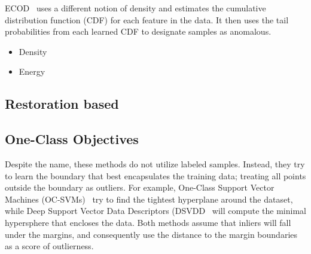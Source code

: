 ECOD~\cite{li_ecod_2022} uses a different notion of density and estimates the cumulative distribution function (CDF) for each feature in the data. It then uses the tail probabilities from each learned CDF to designate samples as anomalous.


\begin{itemize}
    \item Density 
    \item Energy
\end{itemize}

\subsection{Restoration based}

\subsection{One-Class Objectives}

Despite the name, these methods do not utilize labeled samples. Instead, they try to learn the boundary that best encapsulates the training data; treating all points outside the boundary as outliers. For example, One-Class Support Vector Machines (OC-SVMs)~\cite{ocsvm} try to find the tightest hyperplane around the dataset, while Deep Support Vector Data Descriptors (DSVDD~\cite{pmlr-v80-ruff18a}  will compute the minimal hypersphere that encloses the data. Both methods assume that inliers will fall under the margins, and consequently use the distance to the margin boundaries as a score of outlierness. 

